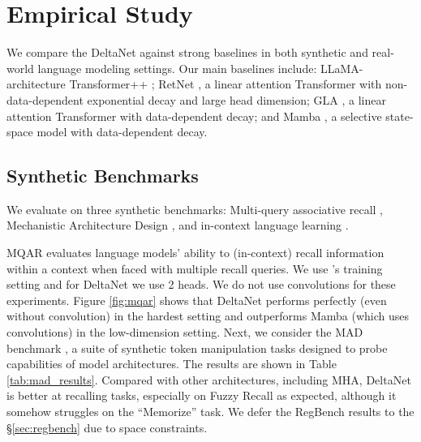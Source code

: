 \vspace{-2mm}
\section{Empirical Study}
\vspace{-2mm}
We compare the DeltaNet against strong baselines in both synthetic and real-world language modeling settings. Our main baselines include: LLaMA-architecture Transformer++ \cite{touvron2023llama};  RetNet \cite{sun2023retentive}, a linear attention Transformer with non-data-dependent exponential decay  and large head dimension; GLA \cite{yang_gated_2023}, a linear attention Transformer with data-dependent decay; and Mamba \cite{gu_mamba_2023}, a selective state-space model with data-dependent decay. 

\vspace{-2mm}
\subsection{Synthetic Benchmarks}
\vspace{-2mm}

We evaluate on three synthetic benchmarks: Multi-query associative recall  \cite[MQAR;][]{zoology}, Mechanistic Architecture Design \cite[MAD;][]{poli_mechanistic_2024}, and in-context language learning  \cite[RegBench;][]{akyurek2024context}.

  

MQAR
 evaluates language models' ability to (in-context) recall information within a context when faced with multiple recall queries. We use \citet{zoology}'s training setting and for DeltaNet we use 2 heads.  We do not use convolutions for these experiments. Figure \ref{fig:mqar} shows that DeltaNet performs perfectly (even without convolution) in the hardest setting and outperforms Mamba (which uses convolutions) in the low-dimension setting. 
Next, we consider the MAD benchmark \cite{poli_mechanistic_2024}, a suite of synthetic token manipulation tasks designed to probe capabilities of model 
 architectures. The results are shown in Table \ref{tab:mad_results}. Compared with other architectures, including MHA, DeltaNet is better at recalling tasks, especially on Fuzzy Recall as expected, although it somehow struggles on the ``Memorize'' task. We defer the RegBench results to the \S\ref{sec:regbench} due to space constraints.



\vspace{-2mm}

